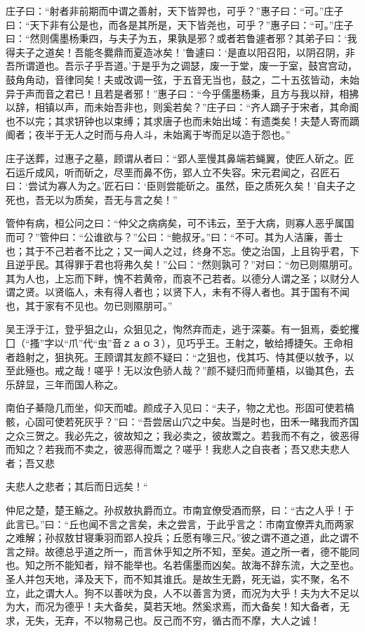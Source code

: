 \documentclass[a4paper,12pt,UTF8,twoside]{ctexbook}
\begin{document}
庄子曰：“射者非前期而中谓之善射，天下皆羿也，可乎？”惠子曰：“可。”庄子曰：“天下非有公是也，而各是其所是，天下皆尧也，可乎？”惠子曰：“可。”庄子曰：“然则儒墨杨秉四，与夫子为五，果孰是邪？或者若鲁遽者邪？其弟子曰：‘我得夫子之道矣！吾能冬爨鼎而夏造冰矣！’鲁遽曰：‘是直以阳召阳，以阴召阴，非吾所谓道也。吾示子乎吾道。’于是乎为之调瑟，废一于堂，废一于室，鼓宫宫动，鼓角角动，音律同矣！夫或改调一弦，于五音无当也，鼓之，二十五弦皆动，未始异于声而音之君已！且若是者邪！”惠子曰∶“今乎儒墨杨秉，且方与我以辩，相拂以辞，相镇以声，而未始吾非也，则奚若矣？”庄子曰：“齐人蹢子于宋者，其命阍也不以完；其求钘钟也以束缚；其求唐子也而未始出域：有遗类矣！夫楚人寄而蹢阍者；夜半于无人之时而与舟人斗，未始离于岑而足以造于怨也。”

庄子送葬，过惠子之墓，顾谓从者曰：“郢人垩慢其鼻端若蝇翼，使匠人斫之。匠石运斤成风，听而斫之，尽垩而鼻不伤，郢人立不失容。宋元君闻之，召匠石曰：‘尝试为寡人为之。’匠石曰：‘臣则尝能斫之。虽然，臣之质死久矣！’自夫子之死也，吾无以为质矣，吾无与言之矣！”

管仲有病，桓公问之曰：“仲父之病病矣，可不讳云，至于大病，则寡人恶乎属国而可？”管仲曰：“公谁欲与？”公曰：“鲍叔牙。”曰：“不可。其为人洁廉，善士也；其于不己若者不比之；又一闻人之过，终身不忘。使之治国，上且钩乎君，下且逆乎民。其得罪于君也将弗久矣！”公曰：“然则孰可？”对曰：“勿已则隰朋可。其为人也，上忘而下畔，愧不若黄帝，而哀不己若者。以德分人谓之圣；以财分人谓之贤。以贤临人，未有得人者也；以贤下人，未有不得人者也。其于国有不闻也，其于家有不见也。勿已则隰朋可。”

吴王浮于江，登乎狙之山，众狙见之，恂然弃而走，逃于深蓁。有一狙焉，委蛇攫囗（“搔”字以“爪”代“虫”音ｚａｏ３），见巧乎王。王射之，敏给搏捷矢。王命相者趋射之，狙执死。王顾谓其友颜不疑曰：“之狙也，伐其巧、恃其便以敖予，以至此殛也。戒之哉！嗟乎！无以汝色骄人哉？”颜不疑归而师董梧，以锄其色，去乐辞显，三年而国人称之。

南伯子綦隐几而坐，仰天而嘘。颜成子入见曰：“夫子，物之尤也。形固可使若槁骸，心固可使若死灰乎？”曰：“吾尝居山穴之中矣。当是时也，田禾一睹我而齐国之众三贺之。我必先之，彼故知之；我必卖之，彼故鬻之。若我而不有之，彼恶得而知之？若我而不卖之，彼恶得而鬻之？嗟乎！我悲人之自丧者；吾又悲夫悲人者；吾又悲

夫悲人之悲者；其后而日远矣！“

仲尼之楚，楚王觞之。孙叔敖执爵而立。市南宜僚受酒而祭，曰：“古之人乎！于此言已。”曰：“丘也闻不言之言矣，未之尝言，于此乎言之：市南宜僚弄丸而两家之难解；孙叔敖甘寝秉羽而郢人投兵；丘愿有喙三尺。”彼之谓不道之道，此之谓不言之辩。故德总乎道之所一，而言休乎知之所不知，至矣。道之所一者，德不能同也。知之所不能知者，辩不能举也。名若儒墨而凶矣。故海不辞东流，大之至也。圣人并包天地，泽及天下，而不知其谁氏。是故生无爵，死无谥，实不聚，名不立，此之谓大人。狗不以善吠为良，人不以善言为贤，而况为大乎！夫为大不足以为大，而况为德乎！夫大备矣，莫若天地。然奚求焉，而大备矣！知大备者，无求，无失，无弃，不以物易己也。反己而不穷，循古而不摩，大人之诚！
\end{document}
